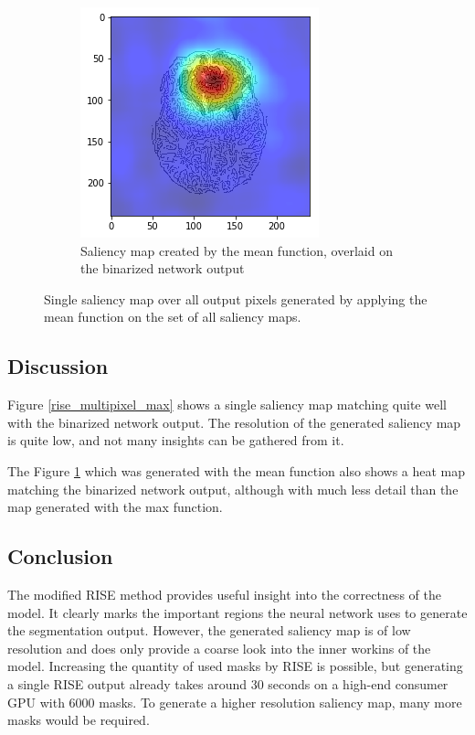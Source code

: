 \begin{figure}[H]
\begin{subfigure}[t]{.4\textwidth}
        \includegraphics[width=\linewidth]{chapters/04_segmentation/images/rise_multipixel_mean_2-1.png}
        \caption{Saliency map created by the mean function, overlaid on the binarized network output}
    \end{subfigure}
    \caption{Single saliency map over all output pixels generated by applying the mean function on the set of all saliency maps.}
    \label{rise_multipixel_mean}
\end{figure}

\subsection{Discussion}
Figure \ref{rise_multipixel_max} shows a single saliency map matching quite well with the binarized network output. The resolution of the generated saliency map
is quite low, and not many insights can be gathered from it.

The Figure \ref{rise_multipixel_mean} which was generated with the mean function also shows a heat map matching the binarized network output, although with much less detail than the map generated with the max function.

\subsection{Conclusion}
The modified RISE method provides useful insight into the correctness of the model. It clearly marks the important regions the neural network uses to generate the segmentation output. However, the generated saliency map is of low resolution and does only provide a coarse look into the inner workins of the model. Increasing the quantity of used masks by RISE is possible, but generating a single RISE output already takes around 30 seconds on a high-end consumer GPU with 6000 masks. To generate a higher resolution saliency map, many more masks would be required.
